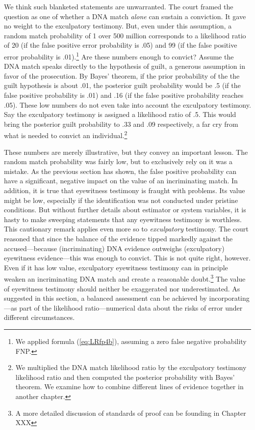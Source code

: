 \documentclass[
  10pt,
  dvipsnames,enabledeprecatedfontcommands]{scrartcl}
\newcommand{\raf}[1]{\todo[color=olive!40]{#1}}
\begin{document}
We think such blanketed statements are unwarranted. The court framed the
question as one of whether a DNA match \textit{alone} can sustain a
conviction. It gave no weight to the exculpatory testimony. But, even
under this assumption, a random match probability of 1 over 500 million
corresponds to a likelihood ratio of 20 (if the false positive error
probability is .05) and 99 (if the false positive error probability is
.01).\footnote{We applied formula (\ref{eq:LRfp4b}), assuming a zero
  false negative probability FNP.} Are these numbers enough to convict?
Assume the DNA match speaks directly to the hypothesis of guilt, a
generous assumption in favor of the prosecution. By Bayes' theorem, if
the prior probability of the the guilt hypothesis is about .01, the
posterior guilt probability would be .5 (if the false positive
probability is .01) and .16 (if the false positive probability reaches
.05). These low numbers do not even take into account the exculpatory
testimony. Say the exculpatory testimony is assigned a likelihood ratio
of .5. This would bring the posterior guilt probability to .33 and .09
respectively, a far cry from what is needed to convict an
individual.\footnote{We multiplied the DNA match likelihood ratio by the
  exculpatory testimony likelihood ratio and then computed the posterior
  probability with Bayes' theorem. We examine how to combine different
  lines of evidence together in another chapter.}
 \raf{M: Check calculations}

These numbers are merely illustrative, but they convey an important
lesson. The random match probability was fairly low, but to exclusively
rely on it was a mistake. As the previous section has shown, the false
positive probability can have a significant, negative impact on the
value of an incriminating match. In addition, it is true that eyewitness
testimony is fraught with problems. Its value might be low, especially
if the identification was not conducted under pristine conditions. But
without further details about estimator or system variables, it is hasty
to make sweeping statements that any eyewitness testimony is worthless.
This cautionary remark applies even more so to \textit{exculpatory}
testimony. The court reasoned that since the balance of the evidence
tipped markedly against the accused---because (incriminating) DNA
evidence outweighs (exculpatory) eyewitness evidence---this was enough
to convict. This is not quite right, however. Even if it has low value,
exculpatory eyewitness testimony can in principle weaken an
incriminating DNA match and create a reasonable doubt.\footnote{A more
  detailed discussion of standards of proof can be founding in Chapter
  XXX} The value of eyewitness testimony should neither be exaggerated
nor underestimated. As suggested in this section, a balanced assessment
can be achieved by incorporating---as part of the likelihood
ratio---numerical data about the risks of error under different
circumstances. 
\end{document}
